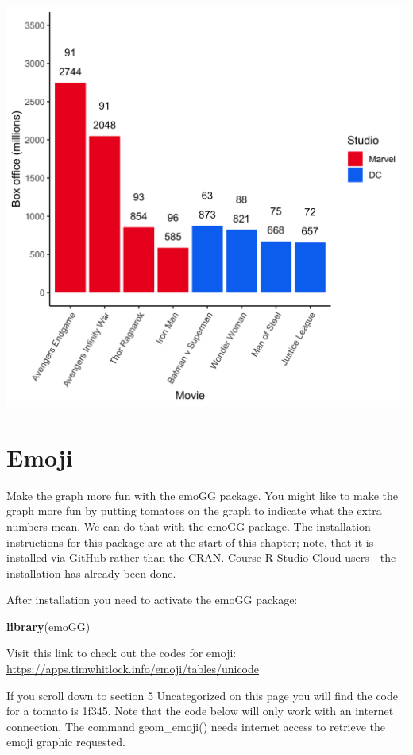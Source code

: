\documentclass[
]{krantz}
\makeatletter
\newenvironment{Shaded}{\begin{snugshade}}{\end{snugshade}}
\newcommand{\KeywordTok}[1]{\textcolor[rgb]{0.27,0.27,0.27}{\textbf{#1}}}
\newcommand{\NormalTok}[1]{#1}
\newenvironment{kframe}{%
\medskip{}
\setlength{\fboxsep}{.8em}
 \def\at@end@of@kframe{}%
 \ifinner\ifhmode%
  \def\at@end@of@kframe{\end{minipage}}%
  \begin{minipage}{\columnwidth}%
 \fi\fi%
 \def\FrameCommand##1{\hskip\@totalleftmargin \hskip-\fboxsep
 \colorbox{shadecolor}{##1}\hskip-\fboxsep
     \hskip-\linewidth \hskip-\@totalleftmargin \hskip\columnwidth}%
 \MakeFramed {\advance\hsize-\width
   \@totalleftmargin\z@ \linewidth\hsize
   \@setminipage}}%
 {\par\unskip\endMakeFramed%
 \at@end@of@kframe}
\renewenvironment{Shaded}{\begin{kframe}}{\end{kframe}}
\makeatother
\begin{document}
\includegraphics[width=0.85\linewidth]{ch_graphing/images/logo_color_graph}

\hypertarget{emoji}{%
\section{Emoji}\label{emoji}}

Make the graph more fun with the emoGG package. You might like to make the graph more fun by putting tomatoes on the graph to indicate what the extra numbers mean. We can do that with the emoGG package. The installation instructions for this package are at the start of this chapter; note, that it is installed via GitHub rather than the CRAN. Course R Studio Cloud users - the installation has already been done.

After installation you need to activate the emoGG package:

\begin{Shaded}
\begin{Highlighting}[]
\KeywordTok{library}\NormalTok{(emoGG)}
\end{Highlighting}
\end{Shaded}

Visit this link to check out the codes for emoji: \url{https://apps.timwhitlock.info/emoji/tables/unicode}

If you scroll down to section 5 Uncategorized on this page you will find the code for a tomato is 1f345. Note that the code below will only work with an internet connection. The command geom\_emoji() needs internet access to retrieve the emoji graphic requested.
\end{document}
